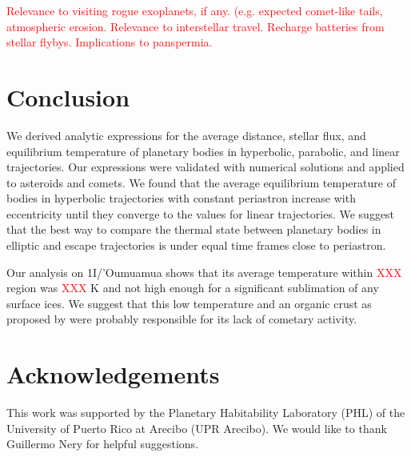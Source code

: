 \documentclass[a4paper,fleqn,usenatbib]{mnras}
\newcommand{\fix}{\textcolor{red}}
\begin{document}
\fix{Relevance to visiting rogue exoplanets, if any. (e.g. expected comet-like tails, atmospheric erosion. Relevance to interstellar travel. Recharge batteries from stellar flybys. Implications to panspermia.}


\section{Conclusion}
\label{sec:conclusion}

We derived analytic expressions for the average distance, stellar flux, and equilibrium temperature of planetary bodies in hyperbolic, parabolic, and linear trajectories. Our expressions were validated with numerical solutions and applied to asteroids and comets. We found that the average equilibrium temperature of bodies in hyperbolic trajectories with constant periastron increase with eccentricity until they converge to the values for linear trajectories. We suggest that the best way to compare the thermal state between planetary bodies in elliptic and escape trajectories is under equal time frames close to periastron.

Our analysis on 1I/'Oumuamua shows that its average temperature within \fix{XXX} region was \fix{XXX} K and not high enough for a significant sublimation of any surface ices. We suggest that this low temperature and an organic crust as proposed by \citet{2017arXiv171206552F} were probably responsible for its lack of cometary activity.

\section*{Acknowledgements}

This work was supported by the Planetary Habitability Laboratory (PHL) of the University of Puerto Rico at Arecibo (UPR Arecibo). We would like to thank Guillermo Nery for helpful suggestions.




%
\end{document}
